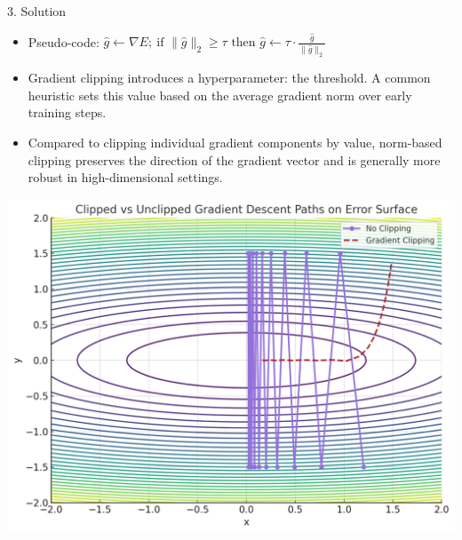 \documentclass[final]{beamer}
\begin{document}
\begin{frame}[t]
\begin{columns}[t,totalwidth=\textwidth]
\begin{column}{0.35\textwidth}
\begin{block}{3. Solution }
        \begin{minipage}{0.54\textwidth}
        \begin{itemize}
          \item Pseudo-code: $\hat{g} \leftarrow \nabla E;\ \text{if } \|\hat{g}\|_2 \geq \tau \text{ then } \hat{g} \leftarrow \tau \cdot \frac{\hat{g}}{\|\hat{g}\|_2}$
          \item Gradient clipping introduces a hyperparameter: the threshold. A common heuristic sets this value based on the average gradient norm over early training steps.
          \item Compared to clipping individual gradient components by value, norm-based clipping preserves the direction of the gradient vector and is generally more robust in high-dimensional settings.
        \end{itemize}
        \end{minipage}
        \hfill
        \begin{minipage}{0.42\textwidth}
        \centering
        \vspace{1em} %
        \includegraphics[width=\linewidth]{figures/gradient_clipping.png}
        \\[-0.3em]
        \end{minipage}


\end{block}
\end{column}
\end{columns}
\end{frame}
\end{document}
